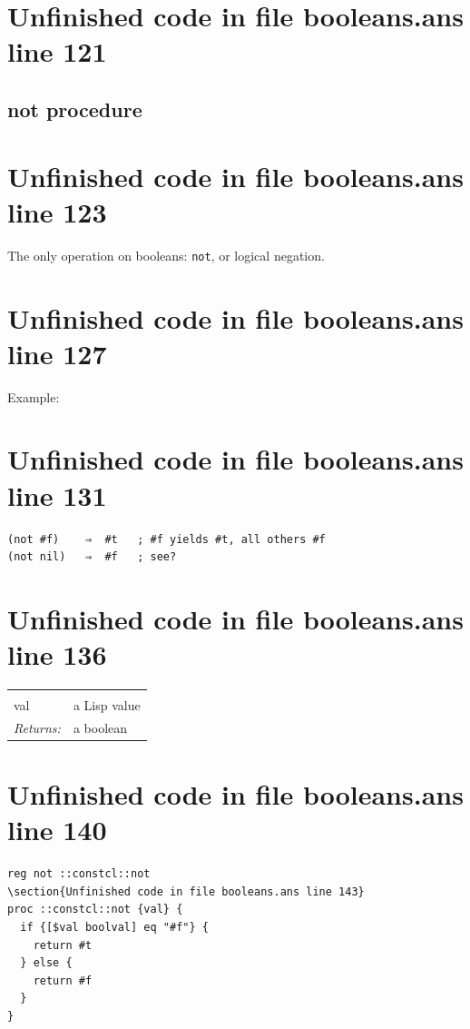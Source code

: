\documentclass[twoside,9pt]{report}
\begin{document}
\section{Unfinished code in file booleans.ans line 121}
\subsection{not procedure}
\label{not-procedure}
\section{Unfinished code in file booleans.ans line 123}


The only operation on booleans: \texttt{not}, or logical negation.

\section{Unfinished code in file booleans.ans line 127}


Example:

\section{Unfinished code in file booleans.ans line 131}
\begin{verbatim}
(not #f)    ⇒  #t   ; #f yields #t, all others #f
(not nil)   ⇒  #f   ; see?
\end{verbatim}
\section{Unfinished code in file booleans.ans line 136}
\noindent\begin{tabular}{ |p{1.9cm} p{8cm}| }
\hline
\rowcolor[HTML]{CCCCCC} \multicolumn{2}{|l|}{\bf not (public)} \\
val & a Lisp value \\
\textit{Returns:} & a boolean \\
\hline
\end{tabular}
\section{Unfinished code in file booleans.ans line 140}
\begin{lstlisting}
reg not ::constcl::not
\section{Unfinished code in file booleans.ans line 143}
proc ::constcl::not {val} {
  if {[$val boolval] eq "#f"} {
    return #t
  } else {
    return #f
  }
}
\end{lstlisting}
\end{document}
